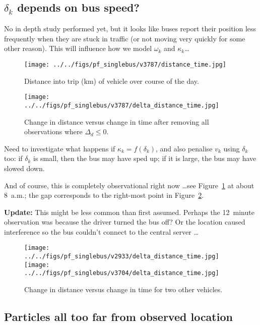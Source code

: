 \documentclass[10pt,a4paper]{article}
\begin{document}
\subsection{$\delta_k$ depends on bus speed?}

No in depth study performed yet, but it looks like buses report their position less 
frequently when they are stuck in traffic (or not moving very quickly for some other
reason).
This will influence how we model $\omega_k$ and $\kappa_k$\ldots




\begin{figure}[hb!]
  \centering
  \texttt{[image: ../../figs/pf\_singlebus/v3787/distance\_time.jpg]}
  \caption{Distance into trip (km) of vehicle over course of the day.}
  \label{fig:distance-time}
\end{figure}

\begin{figure}[tbp]
  \centering
  \texttt{[image: ../../figs/pf\_singlebus/v3787/delta\_distance\_time.jpg]}
  \caption{Change in distance versus change in time after removing all observations where $\Delta_d \leq 0$.}
  \label{fig:delta-distance-time}
\end{figure}


Need to investigate what happens if $\kappa_k = f(\delta_k)$,
and also penalise $v_k$ using $\delta_k$ too: if $\delta_k$ is small, 
then the bus may have sped up; if it is large, the bus may have slowed down.

And of course, this is completely observational right now \ldots see Figure~\ref{fig:distance-time}
at about 8~a.m.; the gap corresponds to the right-most point in Figure~\ref{fig:delta-distance-time}.


\textbf{Update:}
This might be less common than first assumed.
Perhaps the 12~minute observation was because the driver turned the bus off? 
Or the location caused interference so the bus couldn't connect to the central server \ldots

\begin{figure}[hbt!]
  \centering
  \texttt{[image: ../../figs/pf\_singlebus/v2933/delta\_distance\_time.jpg]}
  \texttt{[image: ../../figs/pf\_singlebus/v3704/delta\_distance\_time.jpg]}
  \caption{Change in distance versus change in time for two other vehicles.}
  \label{fig:delta-distance-time2}
\end{figure}


\subsection{Particles all too far from observed location}
\end{document}
